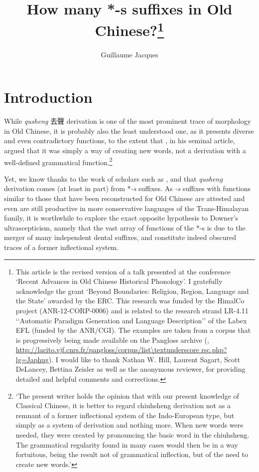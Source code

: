 \documentclass[oneside,a4paper,11pt]{article}
\newcommand{\ipa}[1]{{\phon\textit{\mbox{#1}}}}
\newcommand{\zh}[1]{{\cn#1}}
\begin{document}
 
\title{How many *-s suffixes in Old Chinese?\footnote{This article is the revised version of a talk presented at the conference `Recent Advances in Old Chinese Historical Phonology'. I gratefully acknowledge the grant `Beyond Boundaries: Religion, Region, Language and the State' awarded by the ERC. This research was funded by the HimalCo project (ANR-12-CORP-0006) and is related to the research strand LR-4.11 ‘‘Automatic Paradigm Generation and Language Description’’ of the Labex EFL (funded by the ANR/CGI).  The examples are taken from a corpus that is progressively being made available on the Pangloss archive (\citealt{michailovsky14pangloss}, 
 \url{http://lacito.vjf.cnrs.fr/pangloss/corpus/list\textunderscore rsc.php?lg=Japhug}).  
 I would like to thank Nathan W. Hill, Laurent Sagart, Scott DeLancey, Bettina Zeisler as well as the anonymous reviewer, for providing detailed and helpful comments and corrections.} }  
\author{Guillaume Jacques}
\maketitle
 
\section{Introduction}
While \textit{qusheng} \zh{去聲} derivation is one of the most prominent trace of morphology in Old Chinese, it is probably also the least understood one, as it presents diverse and even contradictory functions, to the extent that \citet[262]{downer59}, in his seminal article, argued that it was simply a way of creating new words, not a derivation with a well-defined grammatical function.\footnote{`The present writer holds the opinion that with our present knowledge of Classical Chinese, it is better to regard chiuhsheng derivation not as a remnant of a former inflectional system of the Indo-European type, but simply as a system of derivation and nothing more. When new words were needed, they were created by pronouncing the basic word in the chiuhsheng. The grammatical regularity found in many cases would then be in a way fortuitous, being the result not of grammatical inflection, but of the need to create new words.'}
 
Yet, we know thanks to the work of scholars such as \citet{haudricourt54chinois}, \citet{forrest60occlusives, schuessler85qusheng} and \citet{sagart99roc} that \textit{qusheng} derivation comes (at least in part) from *\ipa{-s} suffixes. As \ipa{-s} suffixes with functions similar to those that have been reconstructed for Old Chinese are attested and even are still productive in more conservative languages of the Trans-Himalayan family, it is worthwhile to explore the exact opposite hypothesis to Downer's ultrascepticism, namely that the vast array of functions of the *-s is due to the merger of many independent dental suffixes, and constitute indeed obscured traces of a former inflectional system.
\end{document}
